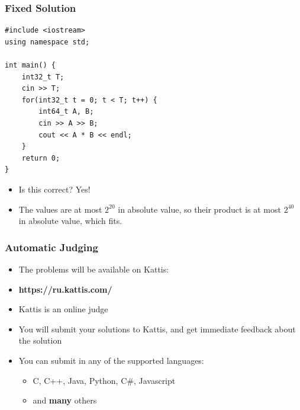 \documentclass{beamer}
\begin{document}
\begin{frame}
    \frametitle{Fixed Solution}
	\begin{scriptsize}
        \begin{verbatim}
#include <iostream>
using namespace std;

int main() {
    int32_t T;
    cin >> T;
    for(int32_t t = 0; t < T; t++) {
        int64_t A, B;
        cin >> A >> B;
        cout << A * B << endl;
    }
    return 0;
}
        \end{verbatim}
    \end{scriptsize}
    \begin{itemize}
       \item<2-> Is this correct?  {\alert{Yes!}}
       \item<3-> The values are at most $2^{20}$ in absolute value, so their product is at most $2^{40}$ in absolute value, which fits. 
    \end{itemize}
\end{frame}

\begin{frame}[plain]
    \frametitle{Automatic Judging}
    \begin{itemize}
        \item The problems will be available on \alert{Kattis}:
        \item \textbf{https://ru.kattis.com/}
        \vspace{20pt}
        \item Kattis is an online judge
        \item You will submit your solutions to Kattis, and get immediate feedback about the solution
        \item You can submit in any of the supported languages:
        \begin{itemize}
            \item C, C++, Java, Python, C\#{}, Javascript
            \item and \textbf{many} others
        \end{itemize}
    \end{itemize}
\end{frame}
\end{document}
